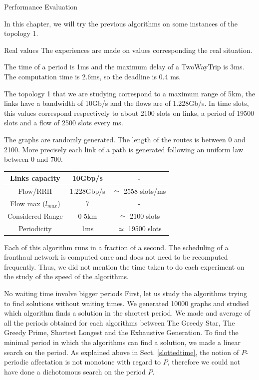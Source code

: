 \documentclass[a4paper,10pt]{report}
\begin{document}
\begin{chapter}{Performance Evaluation}

In this chapter, we will try the previous algorithms on some instances of the topology 1.

\begin{section}{Real values}
 The experiences are made on values corresponding the real situation.
  
  The time of a period is 1ms and the maximum delay of a TwoWayTrip is 3ms. The computation time is 2.6ms, so the deadline is 0.4 ms.
  
 The topology 1 that we are studying correspond to a maximum range of 5km, the links have a bandwidth of 10Gb/s and the flows are of 1.228Gb/s.
 In time slots, this values correspond respectively to about 2100 slots on links, a period of 19500 slots and a flow of 2500 slots every ms.
 
 The graphs are randomly generated. The length of the routes is between 0 and 2100. More precisely
 each link of a path is generated following an uniform law between 0 and 700.
 
 \centering
  \begin{tabular}{|c|c|c|}
  \hline
   Links capacity & 10Gbp/s & -\\
   \hline
   Flow/RRH & 1.228Gbp/s & $\simeq$ 2558 slots/ms\\
   \hline
   Flow max ($l_{max}$) & 7 & -\\
   \hline
   Considered Range & 0-5km & $\simeq$ 2100 slots\\
   \hline
   Periodicity & 1ms & $\simeq$ 19500 slots\\
   \hline
   \end{tabular}
  
Each of this algorithm runs in a fraction of a second. The scheduling of a fronthaul network is computed once and does not 
need to be recomputed frequently. Thus, we did not mention the time taken to do each experiment on the study of the speed of the algorithms.
\end{section}

\begin{section}{No waiting time involve bigger periods}
First, let us study the algorithms trying to find solutions without waiting times.
We generated 10000 graphs and studied which algorithm finds a solution in the shortest period. We made and average of all the periods obtained for each algorithms
between The Greedy Star, The Greedy Prime, Shortest Longest and the Exhaustive Generation.
To find the minimal period in which the algorithms can find a solution, we made a linear search on the period. As explained above in Sect. \ref{slottedtime}, the notion of $P$-periodic affectation is not monotone with regard to $P$,  therefore we could not have done a dichotomous search on the period $P$.


\end{section}
\end{chapter}
\end{document}
